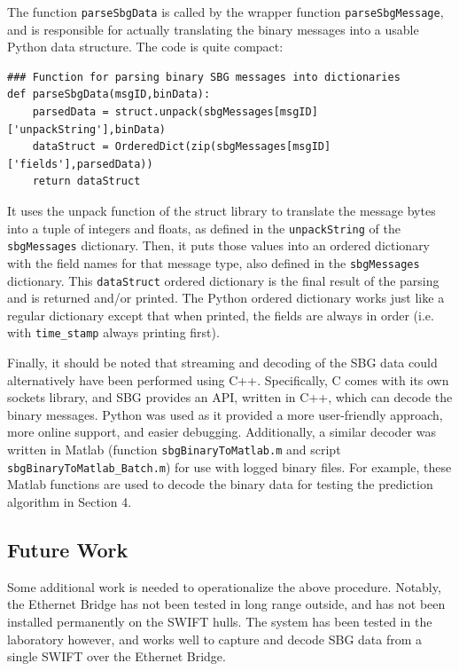 \documentclass[11pt]{article}
\begin{document}
The function \texttt{parseSbgData} is called by the wrapper function \texttt{parseSbgMessage}, and is responsible for actually translating the binary messages into a usable Python data structure.  The code is quite compact:
 \begin{lstlisting}
### Function for parsing binary SBG messages into dictionaries     
def parseSbgData(msgID,binData):
    parsedData = struct.unpack(sbgMessages[msgID]['unpackString'],binData)
    dataStruct = OrderedDict(zip(sbgMessages[msgID]['fields'],parsedData))
    return dataStruct
\end{lstlisting}
 It uses the unpack function of the struct library to translate the message bytes into a tuple of integers and floats, as defined in the \texttt{unpackString} of the \texttt{sbgMessages} dictionary. Then, it puts those values into an ordered dictionary with the field names for that message type, also defined in the \texttt{sbgMessages} dictionary.  This \texttt{dataStruct} ordered dictionary is the final result of the parsing and is returned and/or printed.  The Python ordered dictionary works just like a regular dictionary except that when printed, the fields are always in order (i.e. with \texttt{time\_stamp} always printing first).

 
Finally, it should be noted that streaming and decoding of the SBG data could alternatively have been performed using C++.  Specifically, C comes with its own sockets library, and SBG provides an API, written in C++, which can decode the binary messages.  Python was used as it provided a more user-friendly approach, more online support, and easier debugging.  Additionally, a similar decoder was written in Matlab (function \texttt{sbgBinaryToMatlab.m} and script \texttt{sbgBinaryToMatlab\_Batch.m}) for use with logged binary files.  For example, these Matlab functions are used to decode the binary data for testing the prediction algorithm in Section 4.

\subsection{Future Work}

Some additional work is needed to operationalize the above procedure.  Notably, the Ethernet Bridge has not been tested in long range outside, and has not been installed permanently on the SWIFT hulls.  The system has been tested in the laboratory however, and works well to capture and decode SBG data from a single SWIFT over the Ethernet Bridge.  
\end{document}

